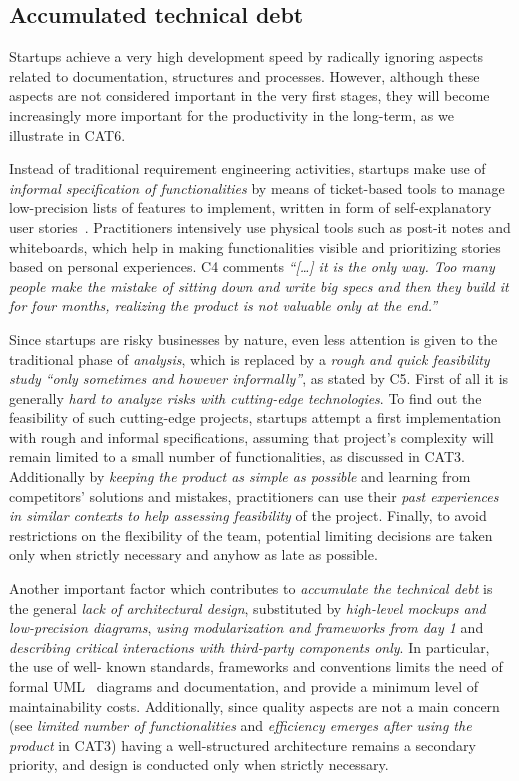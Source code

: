 \documentclass[10pt,journal,letterpaper,compsoc]{IEEEtran}
\begin{document}
\subsection{Accumulated technical debt}\label{res:gsm:cat5} 
Startups achieve a very high development speed by radically ignoring aspects 
related to documentation, structures and processes. However, although these 
aspects are not considered important in the very first stages, they will become
increasingly more important for the productivity in the long-term, as we
illustrate in CAT6.

Instead of traditional requirement engineering activities, startups make use of
\textit{informal specification of functionalities} by means of ticket-based
tools to manage low-precision lists of features to implement, written in form of
self-explanatory user stories~\cite{AgilePlan}. Practitioners intensively use
physical tools such as post-it notes and whiteboards, which help in making
functionalities visible and prioritizing stories based on personal experiences.
C4 comments \textit{``[\ldots] it is the only way. Too many people make the
mistake of sitting down and write big specs and then they build it for four
months, realizing the product is not valuable only at the end.''}

Since startups are risky businesses by nature, even less attention is given to
the traditional phase of \textit{analysis}, which is replaced by a \textit{rough
and quick feasibility study} \textit{``only sometimes and however
informally''}, as stated by C5. First of all it is generally \textit{hard to
analyze risks with cutting-edge technologies}. To find out the feasibility of
such cutting-edge projects, startups attempt a first implementation with rough
and informal specifications, assuming that project's complexity will remain
limited to a small number of functionalities, as discussed in CAT3. Additionally
by \textit{keeping the product as simple as possible} and learning from
competitors' solutions and mistakes, practitioners can use their \textit{past
experiences in similar contexts to help assessing feasibility} of the project.
Finally, to avoid restrictions on the flexibility of the team, potential
limiting decisions are taken only when strictly necessary and anyhow as late as
possible.

Another important factor which contributes to \textit{accumulate the technical
debt} is the general \textit{lack of architectural design}, substituted by
\textit{high-level mockups and low-precision diagrams}, \textit{using
modularization and frameworks from day 1} and \textit{describing critical
interactions with third-party components only}. In particular, the use of well-
known standards, frameworks and conventions limits the need of formal 
UML~\cite{UML} diagrams and documentation, and provide a minimum level of
maintainability costs. Additionally, since quality aspects are not a main
concern (see \textit{limited number of functionalities} and \textit{efficiency
emerges after using the product} in CAT3) having a well-structured architecture
remains a secondary priority, and design is conducted only when strictly
necessary.
\end{document}
